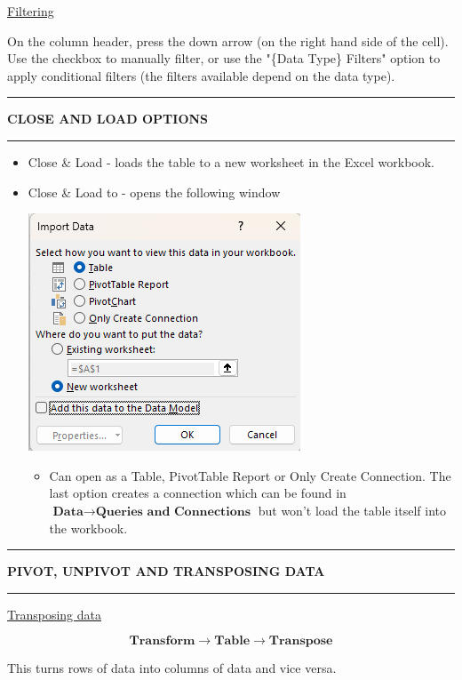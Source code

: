 \documentclass[8pt]{extarticle}
\newcommand{\heading}[1]{%
    \noindent
    \rule{\linewidth}{0.4pt}
    \begin{center}
        \vspace{-1ex}
        \textbf{#1}        
        \vspace{-2.5ex}
    \end{center}
    \rule{\linewidth}{0.4pt}
}
\begin{document}
\begin{multicols}{3}
\begin{center}
    \underline{Filtering}
\end{center}

On the column header, press the down arrow (on the right hand side of the cell). Use the checkbox to manually filter, or use the "\{Data Type\} Filters" option to apply conditional filters (the filters available depend on the data type).

\heading{CLOSE AND LOAD OPTIONS}

\begin{itemize}
    \item Close \& Load - loads the table to a new worksheet in the Excel workbook.
    \item Close \& Load to - opens the following window
    \begin{center}
        \includegraphics[width=0.6\columnwidth]{images/close_and_load_to.png}
    \end{center}
    \begin{itemize}
        \item Can open as a Table, PivotTable Report or Only Create Connection. The last option creates a connection which can be found in $\textbf{Data} \rightarrow \textbf{Queries and Connections}$ but won't load the table itself into the workbook.
    \end{itemize}
\end{itemize}
\columnbreak
\heading{PIVOT, UNPIVOT AND TRANSPOSING DATA}

\begin{center}
    \underline{Transposing data}
\end{center}

\[\textbf{Transform} \rightarrow \textbf{Table} \rightarrow \textbf{Transpose}\]

This turns rows of data into columns of data and vice versa.


\end{multicols}
\end{document}
